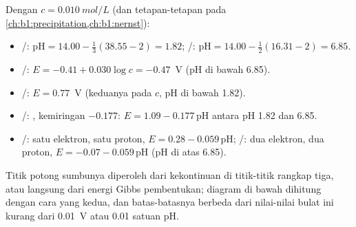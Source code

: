 \begin{example}\label{ex:b1:e-ph-diagrams:iron}
Dengan $c = \qty{0.010}{mol/L}$ (dan tetapan-tetapan pada \cref{ch:b1:precipitation,ch:b1:nernst}):
\begin{itemize}
  \item {}/: $\mathrm{pH} = 14.00 - \frac13(38.55 - 2) = 1.82$;
        /: $\mathrm{pH} = 14.00 - \frac12(16.31 - 2) = 6.85$.
  \item {}/: $E = -0.41 + 0.030\log c = -0.47$~V (pH di bawah 6.85).
  \item {}/: $E = 0.77$~V (keduanya pada $c$, pH di bawah 1.82).
  \item {}/: , kemiringan
        $-0.177$: $E = 1.09 - 0.177\,\mathrm{pH}$ antara pH 1.82 dan 6.85.
  \item {}/: satu elektron, satu proton, $E = 0.28 -
        0.059\,\mathrm{pH}$; /: dua elektron, dua
        proton, $E = -0.07 - 0.059\,\mathrm{pH}$ (pH di atas 6.85).
\end{itemize}
Titik potong sumbunya diperoleh dari kekontinuan di titik-titik rangkap
tiga, atau langsung dari energi Gibbs pembentukan; diagram di bawah
dihitung dengan cara yang kedua, dan batas-batasnya berbeda dari
nilai-nilai bulat ini kurang dari \qty{0.01}{V} atau 0.01 satuan pH.
\end{example}

